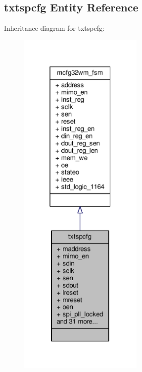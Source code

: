 \subsection{txtspcfg Entity Reference}
\label{classtxtspcfg}


Inheritance diagram for txtspcfg\+:\nopagebreak
\begin{figure}[H]
\begin{center}
\leavevmode
\includegraphics[width=171pt]{da/d81/classtxtspcfg__inherit__graph}
\end{center}
\end{figure}


